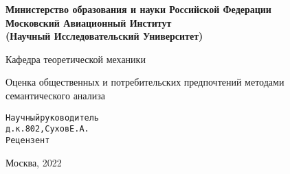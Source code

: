 \begin{titlepage}
    \newpage
    \begin{center}
    {\bfseries Министерство образования и науки Российской Федерации \\
    Московский Авиационный Институт\\ (Научный Исследовательский Университет)}
    \vspace{1cm}
    
    Кафедра теоретической механики
    \vspace{6em}
    \end{center}
    \vspace{1.2em}
    \begin{center}
    \Large Оценка общественных и потребительских предпочтений методами семантического анализа
    \end{center}
    \vspace{4em}
    \begin{center}
     \end{center}
    \vspace{6em}
    \begin{alltt}
                       Научный руководитель
                       д.к. 802, Сухов Е.А.
                       Рецензент        
    \end{alltt}
    \vspace{\fill}
    \begin{center}
    Москва, 2022
    \end{center}

    \end{titlepage}